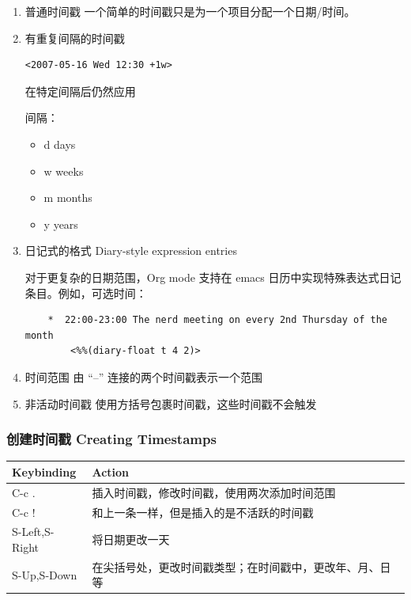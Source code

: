 \documentclass[11pt]{article}
\begin{document}
\begin{enumerate}
\item 普通时间戳
\label{sec:org5e6e9e6}
一个简单的时间戳只是为一个项目分配一个日期/时间。

\item 有重复间隔的时间戳
\label{sec:orgc7ad231}
\begin{verbatim}
<2007-05-16 Wed 12:30 +1w>
\end{verbatim}
在特定间隔后仍然应用

间隔：
\begin{itemize}
\item d
days
\item w
weeks
\item m
months
\item y
years
\end{itemize}

\item 日记式的格式 Diary-style expression entries
\label{sec:org03d6c36}

对于更复杂的日期范围，Org mode 支持在 emacs 日历中实现特殊表达式日记条目。例如，可选时间：
\begin{verbatim}
    *  22:00-23:00 The nerd meeting on every 2nd Thursday of the month
        <%%(diary-float t 4 2)>
\end{verbatim}

\item 时间范围
\label{sec:org0dd7fb1}
由 “--” 连接的两个时间戳表示一个范围

\item 非活动时间戳
\label{sec:org9b25b82}
使用方括号包裹时间戳，这些时间戳不会触发
\end{enumerate}

\subsubsection{创建时间戳 Creating Timestamps}
\label{sec:orgf96bf22}
\begin{center}
\begin{tabular}{ll}
Keybinding & Action\\[0pt]
\hline
C-c . & 插入时间戳，修改时间戳，使用两次添加时间范围\\[0pt]
C-c ! & 和上一条一样，但是插入的是不活跃的时间戳\\[0pt]
S-Left,S-Right & 将日期更改一天\\[0pt]
S-Up,S-Down & 在尖括号处，更改时间戳类型；在时间戳中，更改年、月、日等\\[0pt]
\end{tabular}
\end{center}
\end{document}
